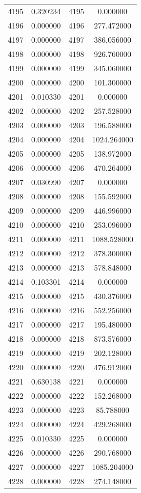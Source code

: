 \documentclass[12pt]{article}
\begin{document}
\begin{longtable}{@{}cccc@{}}
4195 & 0.320234 & 4195 & 0.000000 \\
4196 & 0.000000 & 4196 & 277.472000 \\
4197 & 0.000000 & 4197 & 386.056000 \\
4198 & 0.000000 & 4198 & 926.760000 \\
4199 & 0.000000 & 4199 & 345.060000 \\
4200 & 0.000000 & 4200 & 101.300000 \\
4201 & 0.010330 & 4201 & 0.000000 \\
4202 & 0.000000 & 4202 & 257.528000 \\
4203 & 0.000000 & 4203 & 196.588000 \\
4204 & 0.000000 & 4204 & 1024.264000 \\
4205 & 0.000000 & 4205 & 138.972000 \\
4206 & 0.000000 & 4206 & 470.264000 \\
4207 & 0.030990 & 4207 & 0.000000 \\
4208 & 0.000000 & 4208 & 155.592000 \\
4209 & 0.000000 & 4209 & 446.996000 \\
4210 & 0.000000 & 4210 & 253.096000 \\
4211 & 0.000000 & 4211 & 1088.528000 \\
4212 & 0.000000 & 4212 & 378.300000 \\
4213 & 0.000000 & 4213 & 578.848000 \\
4214 & 0.103301 & 4214 & 0.000000 \\
4215 & 0.000000 & 4215 & 430.376000 \\
4216 & 0.000000 & 4216 & 552.256000 \\
4217 & 0.000000 & 4217 & 195.480000 \\
4218 & 0.000000 & 4218 & 873.576000 \\
4219 & 0.000000 & 4219 & 202.128000 \\
4220 & 0.000000 & 4220 & 476.912000 \\
4221 & 0.630138 & 4221 & 0.000000 \\
4222 & 0.000000 & 4222 & 152.268000 \\
4223 & 0.000000 & 4223 & 85.788000 \\
4224 & 0.000000 & 4224 & 429.268000 \\
4225 & 0.010330 & 4225 & 0.000000 \\
4226 & 0.000000 & 4226 & 290.768000 \\
4227 & 0.000000 & 4227 & 1085.204000 \\
4228 & 0.000000 & 4228 & 274.148000 \\

\end{longtable}
\end{document}
